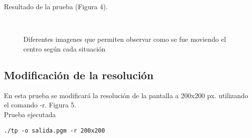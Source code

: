 \documentclass [12pt, a4paper]{article}
\begin{document}
	Resultado de la prueba (Figura 4).
			\begin{figure}[h]
		\centering
		\\ 
		\caption{Diferentes imagenes que permiten observar como se fue moviendo el centro según cada situación}
		\label{f:comparacion3}
	\end{figure} 
\subsection{Modificación de la resolución}
En esta prueba se modificará la resolución de la pantalla a 200x200 px. utilizando el comando -r. Figura 5.
\\
Prueba ejecutada
\begin{lstlisting}[frame=simple,stepnumber=0]
./tp -o salida.pgm -r 200x200
\end{lstlisting}
\end{document}
